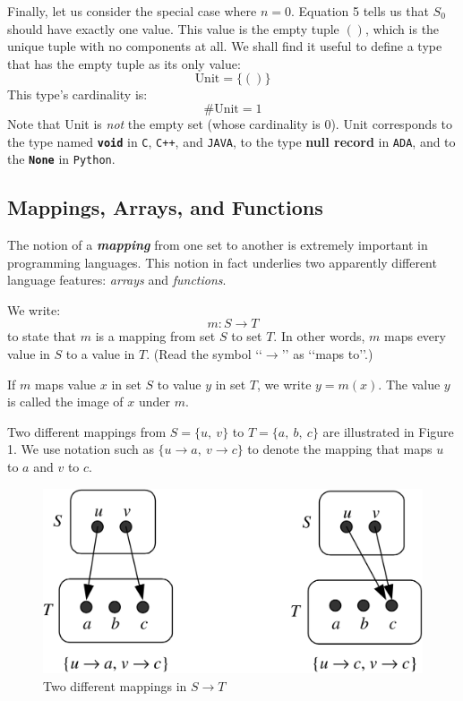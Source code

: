 \documentclass{article}
\begin{document}
Finally, let us consider the special case where $n = 0$. Equation 5 tells us that $S_0$ should have exactly one value. This value is the empty tuple $()$, which is the unique tuple with no components at all. We shall find it useful to define a type that has the empty tuple as its only value:
\begin{equation}
    \text{Unit} = \{()\}
\end{equation}
This type’s cardinality is:
\begin{equation}
    \text{\#Unit} = 1
\end{equation}
Note that Unit is \textit{not} the empty set (whose cardinality is 0). Unit corresponds to the type named \texttt{\textbf{void}} in \texttt{C}, \texttt{C++}, and \texttt{JAVA}, to the type \textbf{null record} in \texttt{ADA}, and to the  \texttt{\textbf{None}} in \texttt{Python}.

\subsection{Mappings, Arrays, and Functions}

The notion of a \textbf{\textit{mapping}} from one set to another is extremely important in programming languages. This notion in fact underlies two apparently different language features: \textit{arrays} and \textit{functions}.

We write:
\begin{equation}
    m : S \rightarrow T
\end{equation}
to state that $m$ is a mapping from set $S$ to set $T$. In other words, $m$ maps every value in $S$ to a value in $T$. (Read the symbol ‘‘$\rightarrow$’’ as ‘‘maps to’’.)

If $m$ maps value $x$ in set $S$ to value $y$ in set $T$, we write $y = m(x)$. The value $y$ is called the image of $x$ under $m$.

Two different mappings from $S = \{u,\ v\}$ to $T = \{a,\ b,\ c\}$ are illustrated in Figure 1. We use notation such as $\{u \rightarrow a,\ v \rightarrow c\}$ to denote the mapping that maps $u$ to $a$ and $v$ to $c$.

\begin{figure}[h!]
    \centering
    \includegraphics[width=.5\textwidth]{img/Fig2.2.png}
    \caption{Two different mappings in $S \rightarrow T$}
    \label{fig:my_label}
\end{figure}
\end{document}

